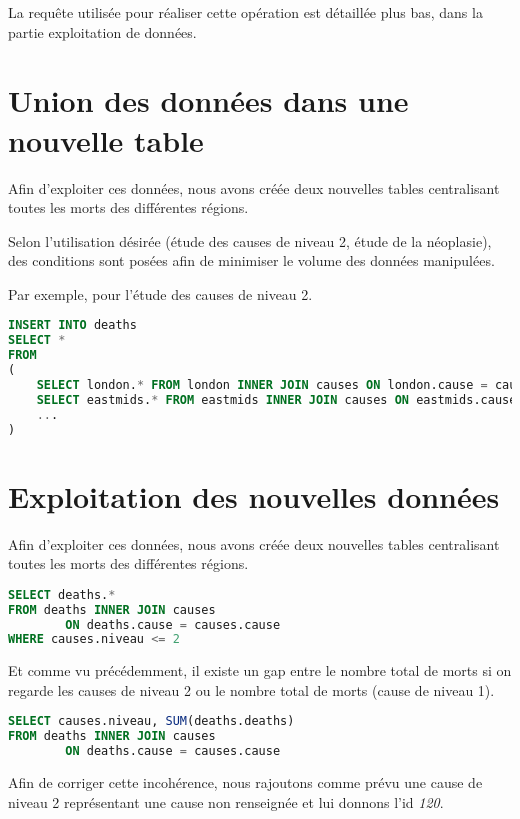     La requête utilisée pour réaliser cette opération est détaillée plus bas, dans la partie exploitation de données.

\section{Union des données dans une nouvelle table}

    Afin d'exploiter ces données, nous avons créée deux nouvelles tables centralisant toutes les morts des différentes régions.

    Selon l'utilisation désirée (étude des causes de niveau 2, étude de la néoplasie), des conditions sont posées afin
    de minimiser le volume des données manipulées.

    Par exemple, pour l'étude des causes de niveau 2.

    \begin{lstlisting}[frame=single, language=SQL]
INSERT INTO deaths
SELECT *
FROM
(
    SELECT london.* FROM london INNER JOIN causes ON london.cause = causes.cause WHERE causes.niveau <= 2 UNION
    SELECT eastmids.* FROM eastmids INNER JOIN causes ON eastmids.cause = causes.cause WHERE causes.niveau <= 2 UNION
    ...
)
    \end{lstlisting}


\section{Exploitation des nouvelles données}

    Afin d'exploiter ces données, nous avons créée deux nouvelles tables centralisant toutes les morts des différentes régions.

    \begin{lstlisting}[frame=single, language=SQL]
SELECT deaths.*
FROM deaths INNER JOIN causes
        ON deaths.cause = causes.cause
WHERE causes.niveau <= 2
    \end{lstlisting}

    Et comme vu précédemment, il existe un gap entre le nombre total de morts si on regarde les causes de niveau 2 ou le nombre
    total de morts (cause de niveau 1).

    \begin{lstlisting}[frame=single, language=SQL]
SELECT causes.niveau, SUM(deaths.deaths)
FROM deaths INNER JOIN causes
        ON deaths.cause = causes.cause
    \end{lstlisting}

    Afin de corriger cette incohérence, nous rajoutons comme prévu une cause de niveau 2 représentant une cause non renseignée
    et lui donnons l'id \textit{120}.

